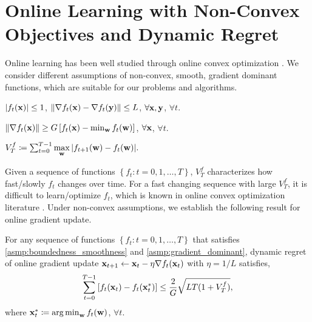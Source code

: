 \section{Online Learning with Non-Convex Objectives and Dynamic Regret}

Online learning has been well studied through online convex optimization \citep{shalev2012online}. We consider different assumptions of non-convex, smooth, gradient dominant functions, which are suitable for our problems and algorithms.

\begin{asmp}
\label{asmp:boundedness_smoothness}
$\left| f_t({\mathbf{x}}) \right| \le 1$, $\left\| \nabla f_t({\mathbf{x}} ) - \nabla f_t({\mathbf{y}}) \right\| \le L $, $\forall {\mathbf{x}}, {\mathbf{y}}$, $\forall t$.
\end{asmp}

\begin{asmp}
\label{asmp:gradient_dominant}
$\left\| \nabla f_t({\mathbf{x}}) \right\| \ge G \left[ f_t({\mathbf{x}}) - \min_{{\mathbf{w}}}{ f_t({\mathbf{w}} )} \right]$, $\forall {\mathbf{x}}$, $\forall t$.
\end{asmp}

\begin{defi}
\label{defi:function_variation}
$V_{T}^{f} \coloneqq \sum_{t=0}^{T-1}{\max\limits_{{\mathbf{w}}}{\left| f_{t+1}({\mathbf{w}}) - f_{t}({\mathbf{w}}) \right| } }.$
\end{defi}

Given a sequence of functions $\left\{ f_t : t = 0, 1, \dots, T \right\}$, $V_{T}^{f} $ characterizes how fast/slowly $f_t$ changes over time. For a fast changing sequence with large $V_{T}^{f} $, it is difficult to learn/optimize $f_t$, which is known in online convex optimization literature \citep{jadbabaie2015online}. Under non-convex assumptions, we establish the following result for online gradient update.

\begin{thm}
\label{thm:online_learning_regret}
For any sequence of functions $\left\{ f_t : t = 0, 1, \dots, T \right\}$ that satisfies \cref{asmp:boundedness_smoothness} and \cref{asmp:gradient_dominant}, dynamic regret of online gradient update ${\mathbf{x}}_{t+1} \gets {\mathbf{x}}_{t} - \eta \nabla f_{t}({\mathbf{x}}_{t})$ with $\eta = 1/L$ satisfies,
\begin{equation}
\label{eq:online_learning_regret}
\begin{split}
    \sum\limits_{t=0}^{T-1}{\left[ f_t({\mathbf{x}}_t) - f_t( {\mathbf{x}}_t^*) \right]} \le \frac{2}{G} \sqrt{L T ( 1 + V_T^f )},
\end{split}
\end{equation}
where ${\mathbf{x}}_t^* \coloneqq \operatorname*{arg\,min}_{{\mathbf{w}}}{f_t({\mathbf{w}})}$, $\forall t$.
\end{thm}

